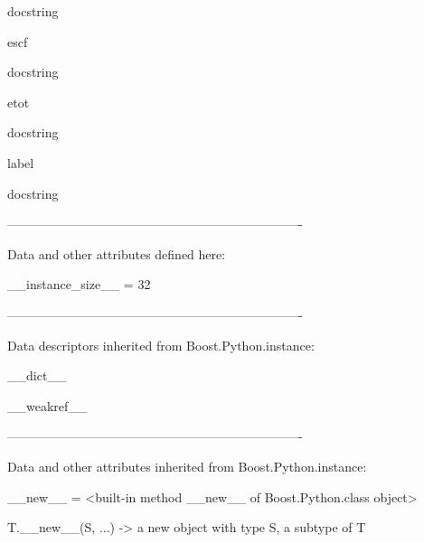 \documentclass[letterpaper,10pt,english]{sphinxmanual}
\begin{document}
\begin{description}
\begin{description}
\begin{DUlineblock}{0em}
\begin{DUlineblock}{\DUlineblockindent}
\item[] docstring
\item[] 
\end{DUlineblock}
\item[] escf
\item[]
\begin{DUlineblock}{\DUlineblockindent}
\item[] docstring
\item[] 
\end{DUlineblock}
\item[] etot
\item[]
\begin{DUlineblock}{\DUlineblockindent}
\item[] docstring
\item[] 
\end{DUlineblock}
\item[] label
\item[]
\begin{DUlineblock}{\DUlineblockindent}
\item[] docstring
\item[] 
\end{DUlineblock}
\item[] ----------------------------------------------------------------------
\item[] Data and other attributes defined here:
\item[] 
\item[] \_\_instance\_size\_\_ = 32
\item[] 
\item[] ----------------------------------------------------------------------
\item[] Data descriptors inherited from Boost.Python.instance:
\item[] 
\item[] \_\_dict\_\_
\item[] 
\item[] \_\_weakref\_\_
\item[] 
\item[] ----------------------------------------------------------------------
\item[] Data and other attributes inherited from Boost.Python.instance:
\item[] 
\item[] \_\_new\_\_ = \textless{}built-in method \_\_new\_\_ of Boost.Python.class object\textgreater{}
\item[]
\begin{DUlineblock}{\DUlineblockindent}
\item[] T.\_\_new\_\_(S, ...) -\textgreater{} a new object with type S, a subtype of T
\end{DUlineblock}
\end{DUlineblock}


\end{description}
\end{description}
\end{document}
